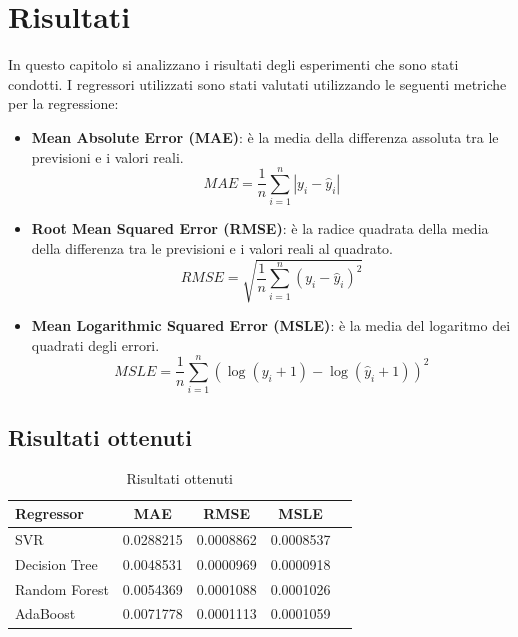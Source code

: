 \section{Risultati}

In questo capitolo si analizzano i risultati degli esperimenti che sono stati condotti. I regressori utilizzati sono stati valutati utilizzando le seguenti metriche per la regressione:
\begin{itemize}
    \item \textbf{Mean Absolute Error (MAE)}: è la media della differenza assoluta tra le previsioni e i valori reali.
    \begin{equation*}
        MAE = \frac{1}{n} \sum_{i=1}^{n} |y_i - \hat{y}_i|
    \end{equation*}
    \item \textbf{Root Mean Squared Error (RMSE)}: è la radice quadrata della media della differenza tra le previsioni e i valori reali al quadrato.
    \begin{equation*}
        RMSE = \sqrt{\frac{1}{n} \sum_{i=1}^{n} (y_i - \hat{y}_i)^2}
    \end{equation*}
    \item \textbf{Mean Logarithmic Squared Error (MSLE)}: è la media del logaritmo dei quadrati degli errori.
    \begin{equation*}
        MSLE = \frac{1}{n} \sum_{i=1}^{n} (\log(y_i + 1) - \log(\hat{y}_i + 1))^2
    \end{equation*}
\end{itemize}

\subsection{Risultati ottenuti}

\begin{table}[H]
    \centering
    \begin{tabular}{|>{\centering\arraybackslash}m{5cm}|c|c|c|c|}
        \hline
        \textbf{Regressor} & \textbf{MAE} & \textbf{RMSE} & \textbf{MSLE} \\ [10pt]
        \hline
        SVR & 0.0288215 & 0.0008862 & 0.0008537 \\ [10pt]
        \hline
        Decision Tree & 0.0048531 & 0.0000969 & 0.0000918 \\ [10pt]
        \hline
        Random Forest & 0.0054369 & 0.0001088 & 0.0001026 \\ [10pt]
        \hline
        AdaBoost & 0.0071778 & 0.0001113 & 0.0001059 \\ [10pt]
        \hline
    \end{tabular}
    \caption{Risultati ottenuti}
    \label{tab:results}
\end{table}


